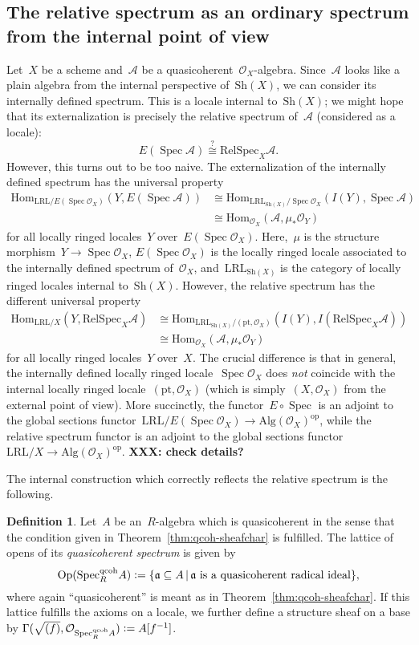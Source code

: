 \documentclass[10pt]{amsart}
\theoremstyle{definition}
\newtheorem{defn}{Definition}[section]
\theoremstyle{plain}
\theoremstyle{remark}
\newcommand{\A}{\mathcal{A}}
\renewcommand{\O}{\mathcal{O}}
\newcommand{\aaa}{\mathfrak{a}}
\newcommand{\Hom}{\mathrm{Hom}}
\newcommand{\Sh}{\mathrm{Sh}}
\newcommand{\Alg}{\mathrm{Alg}}
\newcommand{\LRL}{\mathrm{LRL}}
\newcommand{\pt}{\mathrm{pt}}
\DeclareMathOperator{\Spec}{Spec}
\newcommand{\QcohSpec}[2]{\mathrm{Spec}^{\mathrm{qcoh}}_{#1}{#2}}
\newcommand{\RelSpec}[2]{\mathrm{RelSpec}_{#1}{#2}}
\newcommand{\op}{\mathrm{op}}
\newcommand{\Open}{\mathrm{Op}}
\newcommand{\?}{\,{:}\,}
\renewcommand{\_}{\mathpunct{.}\,}
\newcommand{\XXX}[1]{\textbf{XXX: #1}}
\newcommand{\defeq}{\vcentcolon=}
\begin{document}
\subsection{The relative spectrum as an ordinary spectrum from the internal
point of view} Let~$X$ be a scheme and~$\A$ be a quasicoherent~$\O_X$-algebra.
Since~$\A$ looks like a plain algebra from the internal perspective
of~$\Sh(X)$, we can consider its internally defined spectrum. This is a locale
internal to~$\Sh(X)$; we might hope that its externalization is precisely the
relative spectrum of~$\A$ (considered as a locale):
\[ E(\Spec \A) \stackrel{?}{\cong} \RelSpec{X}{\A}. \]
However, this turns out to be too naive. The externalization of the internally
defined spectrum has the universal property
\begin{align*}
  \Hom_{\LRL/E(\Spec\O_X)}(Y, E(\Spec\A)) & \cong
  \Hom_{\LRL_{\Sh(X)}/\Spec\O_X}(I(Y), \Spec\A) \\
  & \cong \Hom_{\O_X}(\A, \mu_* \O_Y)
\end{align*}
for all locally ringed locales~$Y$ over~$E(\Spec\O_X)$. Here,~$\mu$ is the
structure morphism~$Y \to \Spec\O_X$, $E(\Spec\O_X)$ is the locally ringed
locale associated to the internally defined spectrum of~$\O_X$,
and~$\LRL_{\Sh(X)}$ is the category of locally ringed locales internal
to~$\Sh(X)$. However, the relative spectrum has the different universal property
\begin{align*}
  \Hom_{\LRL/X}(Y, \RelSpec{X}{\A}) & \cong
  \Hom_{\LRL_{\Sh(X)}/(\pt,\O_X)}(I(Y), I(\RelSpec{X}{\A})) \\
  & \cong \Hom_{\O_X}(\A, \mu_* \O_Y)
\end{align*}
for all locally ringed locales~$Y$ over~$X$. The crucial
difference is that in general, the internally defined locally ringed
locale~$\Spec\O_X$ does \emph{not} coincide with the internal locally ringed
locale~$(\pt,\O_X)$ (which is simply~$(X,\O_X)$ from the external point of
view). More succinctly, the functor~$E \circ \Spec$ is an adjoint to the
global sections functor~$\LRL/E(\Spec\O_X) \to \Alg(\O_X)^\op$, while the
relative spectrum functor is an adjoint to the global sections functor~$\LRL/X
\to \Alg(\O_X)^\op$.
\XXX{check details?}

The internal construction which correctly reflects the relative spectrum is the
following.
\begin{defn}Let~$A$ be an~$R$-algebra which is quasicoherent in the sense that
the condition given in Theorem~\ref{thm:qcoh-sheafchar} is fulfilled. The
lattice of opens of its \emph{quasicoherent spectrum} is given by
\[ \Open(\QcohSpec{R}{A}) \defeq \{ \aaa \subseteq A \,|\,
  \text{$\aaa$ is a quasicoherent radical ideal} \}, \]
where again ``quasicoherent'' is meant as in Theorem~\ref{thm:qcoh-sheafchar}.
If this lattice fulfills the axioms on a locale, we further define a
structure sheaf on a base by
$\Gamma(\sqrt{(f)}, \O_{\QcohSpec{R}{A}}) \defeq A[f^{-1}]$.
\end{defn}
\end{document}
